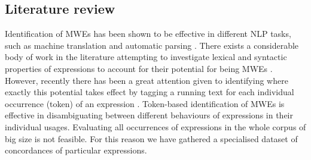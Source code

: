 \documentclass[output=paper
,modfonts
,nonflat]{langsci/langscibook}
\begin{document}



\subsection{Literature review}

Identification of MWEs has been shown to be effective in different NLP tasks, such as machine translation \citep{pal2011} and automatic parsing \citep{Constant2012}.
There exists a considerable body of work in the literature attempting to investigate lexical and syntactic properties of expressions to account for their potential for being MWEs \citep{ramisch2014multiword,baldwin2010multiword}. 
However, recently there has been a great attention given to identifying where exactly this potential takes effect by tagging a running text for each individual occurrence (token) of an expression \citep{Schneider14b,constant2012evaluating,Gharbieh2017}. 
Token-based identification of MWEs is effective in disambiguating between different behaviours of expressions in their individual usages. 
Evaluating all occurrences of expressions in the whole corpus of big size is not feasible. For this reason we have gathered a specialised dataset of concordances of particular expressions.
\end{document}
